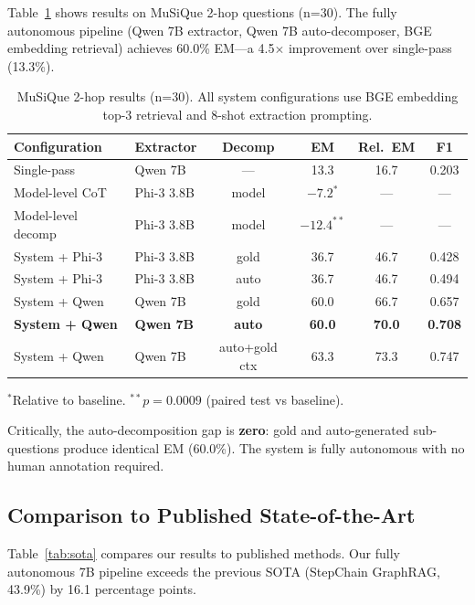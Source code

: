 \documentclass[11pt]{article}
\begin{document}
Table~\ref{tab:main} shows results on MuSiQue 2-hop questions (n=30). The fully autonomous pipeline (Qwen 7B extractor, Qwen 7B auto-decomposer, BGE embedding retrieval) achieves 60.0\% EM---a 4.5$\times$ improvement over single-pass (13.3\%).

\begin{table}[htbp]
\centering
\caption{MuSiQue 2-hop results (n=30). All system configurations use BGE embedding top-3 retrieval and 8-shot extraction prompting.}
\label{tab:main}
\begin{tabular}{llcccc}
\toprule
\textbf{Configuration} & \textbf{Extractor} & \textbf{Decomp} & \textbf{EM} & \textbf{Rel.\ EM} & \textbf{F1} \\
\midrule
Single-pass & Qwen 7B & --- & 13.3 & 16.7 & 0.203 \\
Model-level CoT & Phi-3 3.8B & model & $-7.2^*$ & --- & --- \\
Model-level decomp & Phi-3 3.8B & model & $-12.4^{**}$ & --- & --- \\
\midrule
System + Phi-3 & Phi-3 3.8B & gold & 36.7 & 46.7 & 0.428 \\
System + Phi-3 & Phi-3 3.8B & auto & 36.7 & 46.7 & 0.494 \\
System + Qwen & Qwen 7B & gold & 60.0 & 66.7 & 0.657 \\
\textbf{System + Qwen} & \textbf{Qwen 7B} & \textbf{auto} & \textbf{60.0} & \textbf{70.0} & \textbf{0.708} \\
System + Qwen & Qwen 7B & auto+gold ctx & 63.3 & 73.3 & 0.747 \\
\bottomrule
\end{tabular}
\vspace{2pt}
{\small $^*$Relative to baseline. $^{**}p=0.0009$ (paired test vs baseline).}
\end{table}

Critically, the auto-decomposition gap is \textbf{zero}: gold and auto-generated sub-questions produce identical EM (60.0\%). The system is fully autonomous with no human annotation required.

\subsection{Comparison to Published State-of-the-Art}

Table~\ref{tab:sota} compares our results to published methods. Our fully autonomous 7B pipeline exceeds the previous SOTA (StepChain GraphRAG, 43.9\%) by 16.1 percentage points.
\end{document}
